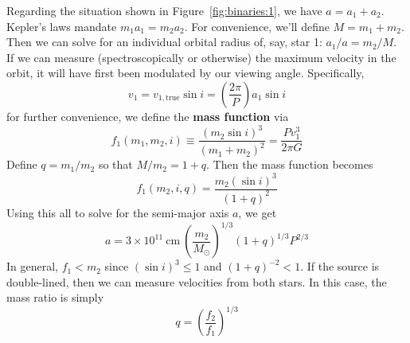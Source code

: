 \documentclass[10pt]{article}
\numberwithin{equation}{section}
\begin{document}
	Regarding the situation shown in Figure~\ref{fig:binaries:1}, we have $a = a_1+a_2$. Kepler's laws mandate $m_1a_1 = m_2a_2$. For convenience, we'll define $M=m_1 + m_2$. Then we can solve for an individual orbital radius of, say, star 1: $a_1/a = m_2/M$. If we can measure (spectroscopically or otherwise) the maximum velocity in the orbit, it will have first been modulated by our viewing angle. Specifically,
	\begin{equation}
		\label{eq:binaries:2} v_1 = v_{1,\mathrm{true}}\sin i = \left(\frac{2\pi}{P}\right)a_1\sin i
	\end{equation}
	for further convenience, we define the \textbf{mass function} via
	\begin{equation}
		\label{eq:binaries:3} f_1(m_1, m_2, i) \equiv \frac{(m_2\sin i)^3}{(m_1+m_2)^2} = \frac{Pv_1^3}{2\pi G}
	\end{equation}
	Define $q = m_1/m_2$ so that $M/m_2 = 1+q$. Then the mass function becomes
	\begin{equation}
		\label{eq:binaries:4} f_1(m_2, i, q) = \frac{m_2(\sin i)^3}{(1+q)^2}
	\end{equation}
	Using this all to solve for the semi-major axis $a$, we get
	\begin{equation}
		\label{eq:binaries:5} \boxed{a = 3\times 10^{11}\ \mathrm{cm}\ \left(\frac{m_2}{M_\odot}\right)^{1/3}(1+q)^{1/3}P^{2/3}}
	\end{equation}
	In general, $f_1 < m_2$ since $(\sin i)^3 \leq 1$ and $(1+q)^{-2} < 1$. If the source is double-lined, then we can measure velocities from both stars. In this case, the mass ratio is simply
	\begin{equation}
		\label{eq:binaries:6} q = \left(\frac{f_2}{f_1}\right)^{1/3}
	\end{equation}
\end{document}
